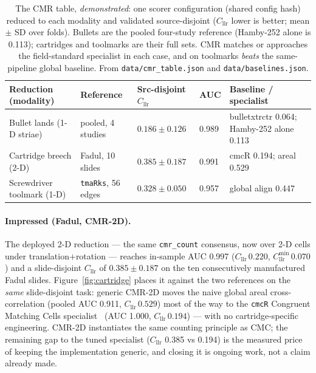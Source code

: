\documentclass[11pt]{article}
\newcommand{\Cllr}{C_{\mathrm{llr}}}
\newcommand{\Cllrmin}{C_{\mathrm{llr}}^{\min}}
\newcommand{\code}[1]{\texttt{#1}}
\begin{document}
\begin{table}[t]
  \centering\small
  \begin{tabular}{@{}lllll@{}}
    \toprule
    \textbf{Reduction (modality)} & \textbf{Reference} & \textbf{Src-disjoint $\Cllr$} & \textbf{AUC} & \textbf{Baseline / specialist} \\
    \midrule
    Bullet lands (1-D striae)   & pooled, 4 studies   & $\num{0.186}\pm\num{0.126}$ & \num{0.989} & bulletxtrctr \num{0.064}; Hamby-252 alone \num{0.113} \\
    Cartridge breech (2-D)      & Fadul, 10 slides    & $\num{0.385}\pm\num{0.187}$ & \num{0.991} & cmcR \num{0.194}; areal \num{0.529} \\
    Screwdriver toolmark (1-D)  & \code{tmaRks}, 56 edges & $\num{0.328}\pm\num{0.050}$ & \num{0.957} & global align \num{0.447} \\
    \bottomrule
  \end{tabular}
  \caption{The CMR table, \emph{demonstrated}: one scorer configuration (shared config
    hash) reduced to each modality and validated source-disjoint ($\Cllr$ lower is
    better; mean $\pm$ SD over folds). Bullets are the pooled four-study reference
    (Hamby-252 alone is \num{0.113}); cartridges and toolmarks are their full sets. CMR
    matches or approaches the field-standard specialist in each case, and on toolmarks
    \emph{beats} the same-pipeline global baseline. From \code{data/cmr\_table.json} and
    \code{data/baselines.json}.}
  \label{tab:reductions}
\end{table}

\paragraph{Impressed (Fadul, CMR-2D).} The deployed 2-D reduction --- the same
\code{cmr\_count} consensus, now over 2-D cells under translation$+$rotation --- reaches
in-sample AUC \num{0.997} ($\Cllr\,\num{0.220}$, $\Cllrmin\,\num{0.070}$) and a
slide-disjoint $\Cllr$ of $\num{0.385}\pm\num{0.187}$ on the ten consecutively
manufactured Fadul slides. Figure~\ref{fig:cartridge} places it against the two
references on the \emph{same} slide-disjoint task: generic CMR-2D moves the naive global
areal cross-correlation (pooled AUC \num{0.911}, $\Cllr\,\num{0.529}$) most of the way
to the \code{cmcR} Congruent Matching Cells specialist~\cite{zemmels2023} (AUC \num{1.000},
$\Cllr\,\num{0.194}$) --- with no cartridge-specific engineering. CMR-2D instantiates
the same counting principle as CMC; the remaining gap to the tuned specialist
($\Cllr$ \num{0.385} vs \num{0.194}) is the measured price of keeping the
implementation generic, and closing it is ongoing work, not a claim already made.
\end{document}
